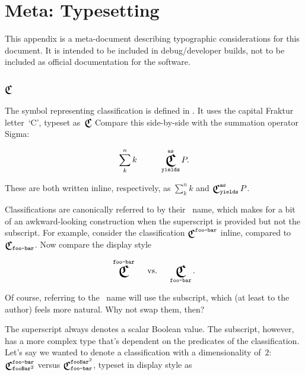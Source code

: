 
\section{Meta: Typesetting}
This appendix is a meta-document describing typographic considerations for
  this document.
It is intended to be included in debug/developer builds,
  not to be included as official documentation for the software.

\subsection{$\Classify$}
The symbol representing classification is defined in .
It uses the capital Fraktur letter~`C',
  typeset as~$\Classify\!\!$.
Compare this side-by-side with the summation operator Sigma:

\def\EXSUM{\sum_k^n k}
\def\EXCLASS{\Classify^\texttt{as}_\texttt{yields} P}

\begin{equation*}
 \EXSUM \mspace{50mu} \EXCLASS.
\end{equation*}

These are both written inline, respectively, as
  $\EXSUM$ and $\EXCLASS$.

Classifications are canonically referred to by their ~name,
  which makes for a bit of an awkward-looking construction when the
  superscript is provided but not the subscript.
For example, consider the classification $\Classify^\texttt{foo-bar}$ inline,
  compared to~$\Classify_\texttt{foo-bar}$.
Now compare the display style

\begin{equation*}
  \Classify^\texttt{foo-bar}
  \mspace{25mu}\text{vs.}\mspace{25mu}
  \Classify_\texttt{foo-bar}.
\end{equation*}

Of course,
  referring to the ~name will use the subscript,
    which (at least to the author) feels more natural.
Why not swap them, then?

The superscript always denotes a scalar Boolean value.
The subscript,
  however,
  has a more complex type that's dependent on the predicates of the classification.
Let's say we wanted to denote a classification with a dimensionality of~$2$:
  $\Classify^\texttt{foo-bar}_{\texttt{fooBar}^2}$ versus
  $\Classify_\texttt{foo-bar}^{\texttt{fooBar}^2}$,
    typeset in display style as

